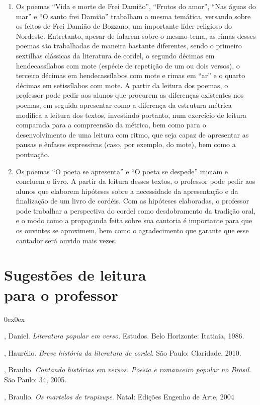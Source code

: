 \begin{enumerate}
\item Os poemas ``Vida e morte de Frei Damião'', ``Frutos do
amor'', ``Nas águas do mar'' e ``O santo frei
Damião'' trabalham a mesma temática, versando sobre
os feitos de Frei Damião de Bozzano, um importante líder religioso do
Nordeste. Entretanto, apesar de falarem sobre o mesmo tema, as rimas
desses poemas são trabalhadas de maneira bastante diferentes, sendo o
primeiro sextilhas clássicas da literatura de cordel, o segundo décimas
em hendecassílabos com mote (espécie de repetição de um ou dois
versos), o terceiro décimas em hendecassílabos com mote e rimas em
``ar'' e o quarto décimas em
setissílabos com mote. A partir da leitura dos poemas, o professor pode
pedir aos alunos que procurem as diferenças existentes nos poemas, em
seguida apresentar como a diferença da estrutura métrica modifica a
leitura dos textos, investindo portanto, num exercício de leitura
comparada para a compreensão da métrica, bem como para o
desenvolvimento de uma leitura com ritmo, que seja capaz de apresentar
as pausas e ênfases expressivas (caso, por exemplo, do mote), bem como
a pontuação. 

\item Os poemas ``O poeta se
apresenta'' e ``O poeta se
despede'' iniciam e concluem o livro. A partir da
leitura desses textos, o professor pode pedir aos alunos que elaborem
hipóteses sobre a necessidade da apresentação e da finalização de um
livro de cordéis. Com as hipóteses elaboradas, o professor pode
trabalhar a perspectiva do cordel como desdobramento da tradição oral,
e o modo como a propaganda feita sobre sua cantoria é importante para
que os ouvintes se aproximem, bem como o agradecimento que garante que
esse cantador será ouvido mais vezes. 

\end{enumerate}

\section{Sugestões de leitura\\ para o professor} 

\begin{description}0ex\parsep0ex

, Daniel. \textit{Literatura popular em verso}. Estudos. Belo Horizonte: Itatiaia, 1986. 

, Haurélio. \textit{Breve história da literatura de cordel}. São Paulo: Claridade, 2010.

, Braulio. \textit{Contando histórias em versos. Poesia e romanceiro popular no Brasil}. São Paulo: 34, 2005.

, Braulio. \textit{Os martelos de trupizupe}. Natal: Edições Engenho de Arte, 2004 

\end{description}

\paginabranca
\paginabranca
\paginabranca
\paginabranca
